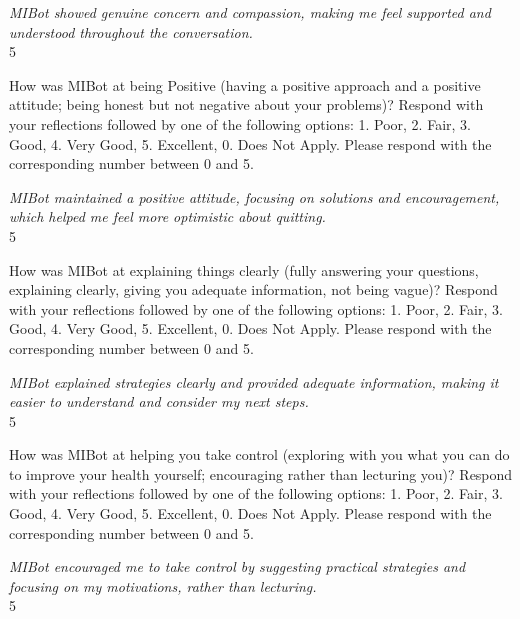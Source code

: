 \begin{clientbox}
	\textit{MIBot showed genuine concern and compassion, making me feel supported and understood throughout the conversation.} \\
	5
\end{clientbox}

\begin{researcherbox}
	How was MIBot at being Positive (having a positive approach and a positive attitude; being honest but not negative about your problems)? Respond with your reflections followed by one of the following options: 1. Poor, 2. Fair, 3. Good, 4. Very Good, 5. Excellent, 0. Does Not Apply. Please respond with the corresponding number between 0 and 5.
\end{researcherbox}

\begin{clientbox}
	\textit{MIBot maintained a positive attitude, focusing on solutions and encouragement, which helped me feel more optimistic about quitting.} \\
	5
\end{clientbox}

\begin{researcherbox}
	How was MIBot at explaining things clearly (fully answering your questions, explaining clearly, giving you adequate information, not being vague)? Respond with your reflections followed by one of the following options: 1. Poor, 2. Fair, 3. Good, 4. Very Good, 5. Excellent, 0. Does Not Apply. Please respond with the corresponding number between 0 and 5.
\end{researcherbox}

\begin{clientbox}
	\textit{MIBot explained strategies clearly and provided adequate information, making it easier to understand and consider my next steps.} \\
	5
\end{clientbox}

\begin{researcherbox}
	How was MIBot at helping you take control (exploring with you what you can do to improve your health yourself; encouraging rather than lecturing you)? Respond with your reflections followed by one of the following options: 1. Poor, 2. Fair, 3. Good, 4. Very Good, 5. Excellent, 0. Does Not Apply. Please respond with the corresponding number between 0 and 5.
\end{researcherbox}

\begin{clientbox}
	\textit{MIBot encouraged me to take control by suggesting practical strategies and focusing on my motivations, rather than lecturing.} \\
	5
\end{clientbox}

